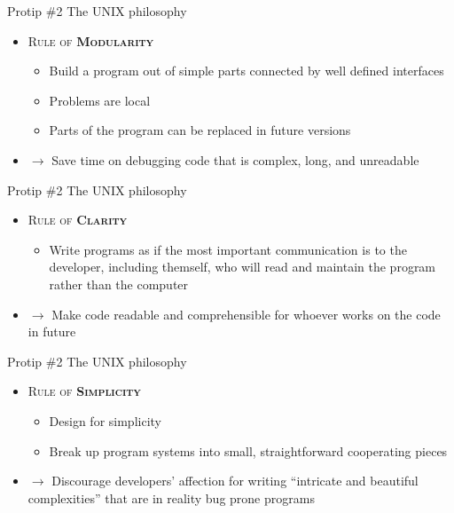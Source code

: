 \documentclass[18pt]{beamer}
\newcommand{\quotes}[1]{``#1''}
\begin{document}
\begin{frame}{Protip \#2 The UNIX philosophy}
    \begin{itemize}
        \item \textsc{Rule of \textbf{Modularity}}
        \begin{itemize}
            \item Build a program out of simple parts connected by well defined interfaces
            \item Problems are local
            \item Parts of the program can be replaced in future versions
        \end{itemize}
        \vspace{.2in}
        \item $\rightarrow$ Save time on debugging code that is complex, long, and unreadable
    \end{itemize}
\end{frame}

\begin{frame}{Protip \#2 The UNIX philosophy}
    \begin{itemize}
        \item \textsc{Rule of \textbf{Clarity}}
        \begin{itemize}
            \item Write programs as if the most important communication is to the developer, including themself,
            who will read and maintain the program rather than the computer
        \end{itemize}
        \vspace{.2in}
        \item $\rightarrow$ Make code readable and comprehensible for whoever works on the code in future
    \end{itemize}
\end{frame}

\begin{frame}{Protip \#2 The UNIX philosophy}
    \begin{itemize}
        \item \textsc{Rule of \textbf{Simplicity}}
        \begin{itemize}
            \item Design for simplicity
            \item Break up program systems into small, straightforward cooperating pieces
        \end{itemize}
        \vspace{.2in}
        \item $\rightarrow$ Discourage developers' affection for writing \quotes{intricate and beautiful complexities}
        that are in reality bug prone programs
    \end{itemize}
\end{frame}
\end{document}
